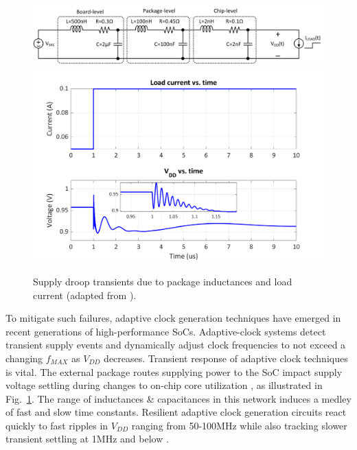\documentclass[twoside,9pt,journal,letterpage]{IEEEtran}
\begin{document}
\begin{figure}[h]
	\centering
	\includegraphics[width=\columnwidth]{fig_droop_schem}
	\includegraphics[width=\columnwidth]{fig_droop}
	\caption{Supply droop transients due to package inductances and load current (adapted from \cite{hashimoto2018}).}
	\label{fig:droop}
\end{figure}

To mitigate such failures, adaptive clock generation techniques have emerged in recent generations of high-performance SoCs\cite{ahmad2017,hashimoto2018,wilcox2015,floyd2017,bowman2016}. Adaptive-clock systems detect transient supply events and dynamically adjust clock frequencies to not exceed a changing $f_{MAX}$ as $V_{DD}$ decreases. %
Transient response of adaptive clock techniques is vital. The external package routes supplying power to the SoC impact supply voltage settling during changes to on-chip core utilization \cite{hashimoto2018}, as illustrated in Fig.\ \ref{fig:droop}. The range of inductances \& capacitances in this network induces a medley of fast and slow time constants. Resilient adaptive clock generation circuits react quickly to fast ripples in $V_{DD}$ ranging from 50-100MHz \cite{hashimoto2018,wilcox2015} while also tracking slower transient settling at 1MHz and below \cite{hashimoto2018,bowman2016,wilcox2015}.
\end{document}
